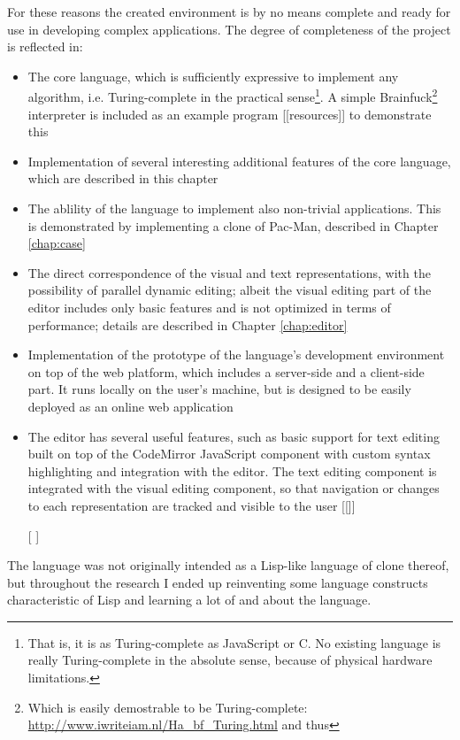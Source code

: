 For these reasons the created environment is by no means complete and ready for
use in developing complex applications. The degree of completeness of the
project is reflected in:
\begin{itemize}
    \item The core language, which is sufficiently expressive to implement any
      algorithm, i.e. Turing-complete in the practical sense\footnote{That is,
        it is as Turing-complete as JavaScript or C. No existing language is
        really Turing-complete in the absolute sense, because of physical
        hardware limitations.}. A simple Brainfuck\footnote{Which is easily
        demostrable to be Turing-complete:
        \url{http://www.iwriteiam.nl/Ha_bf_Turing.html} and thus} interpreter is
      included as an example program [[resources]] to demonstrate this
    \item Implementation of several interesting additional features of the core
      language, which are described in this chapter 
    \item The ablility of the language to implement also non-trivial
      applications. This is demonstrated by implementing a clone of Pac-Man,
      described in Chapter \ref{chap:case}
    \item The direct correspondence of the visual and text representations, with
      the possibility of parallel dynamic editing; albeit the visual editing
      part of the editor includes only basic features and is not optimized in
      terms of performance; details are described in Chapter \ref{chap:editor}
    \item Implementation of the prototype of the language's development
      environment on top of the web platform, which includes a server-side and a
      client-side part. It runs locally on the user's machine, but is designed
      to be easily deployed as an online web application
    \item The editor has several useful features, such as basic support for text
      editing built on top of the CodeMirror JavaScript component with custom
      syntax highlighting and integration with the editor. The text editing
      component is integrated with the visual editing component, so that
      navigation or changes to each representation are tracked and visible to
      the user [[]]
    \item [[]]
\end{itemize}

The language was not originally intended as a Lisp-like language of clone
thereof, but throughout the research I ended up reinventing some language
constructs characteristic of Lisp and learning a lot of and about the language.

